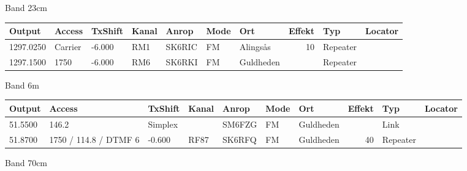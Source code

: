 \large{Band 23cm}
\begin{longtable}{lllllllrlr}
Output & Access & TxShift & Kanal & Anrop & Mode & Ort & Effekt & Typ & Locator \\ \hline
1297.0250&Carrier&-6.000&RM1&SK6RIC&FM&Alingsås&10&Repeater&\\
1297.1500&1750&-6.000&RM6&SK6RKI&FM&Guldheden&&Repeater&\\
\end{longtable}
\large{Band 6m}
\begin{longtable}{lllllllrlr}
Output & Access & TxShift & Kanal & Anrop & Mode & Ort & Effekt & Typ & Locator \\ \hline
51.5500&146.2&Simplex&&SM6FZG&FM&Guldheden&&Link&\\
51.8700&1750 / 114.8 / DTMF 6&-0.600&RF87&SK6RFQ&FM&Guldheden&40&Repeater&\\
\end{longtable}
\large{Band 70cm}
